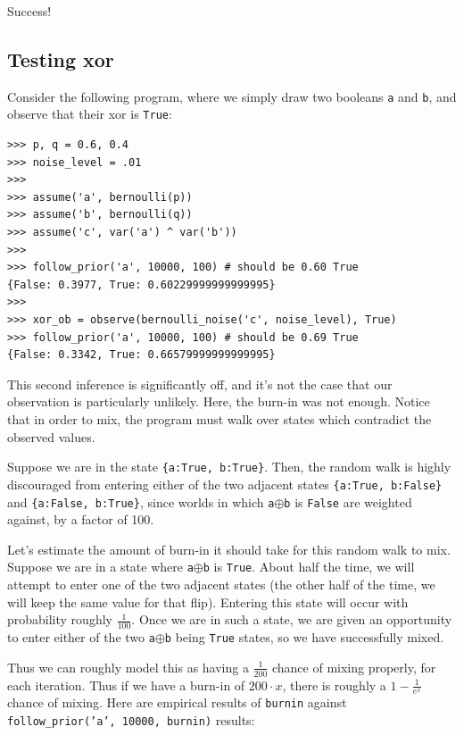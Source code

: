 \documentclass[11pt]{article}
\begin{document}
\noindent Success!


\subsection{Testing xor}

\noindent Consider the following program, where we simply draw two booleans {\tt a} and {\tt b}, and observe that their xor is {\tt True}:

\begin{small}
\begin{verbatim}
>>> p, q = 0.6, 0.4
>>> noise_level = .01
>>>
>>> assume('a', bernoulli(p))
>>> assume('b', bernoulli(q))
>>> assume('c', var('a') ^ var('b'))
>>>
>>> follow_prior('a', 10000, 100) # should be 0.60 True
{False: 0.3977, True: 0.60229999999999995}
>>>
>>> xor_ob = observe(bernoulli_noise('c', noise_level), True)
>>> follow_prior('a', 10000, 100) # should be 0.69 True
{False: 0.3342, True: 0.66579999999999995}
\end{verbatim}
\end{small}



This second inference is significantly off, and it's not the case that our observation is particularly unlikely.  Here, the burn-in was not enough.  Notice that in order to mix, the program must walk over states which contradict the observed values.  

Suppose we are in the state {\tt \{a:True, b:True\}}.  Then, the random walk is highly discouraged from entering either of the two adjacent states {\tt \{a:True, b:False\}} and {\tt \{a:False, b:True\}}, since worlds in which {\tt a$\oplus$b} is {\tt False} are weighted against, by a factor of 100.  

Let's estimate the amount of burn-in it should take for this random walk to mix.  Suppose we are in a state where {\tt a$\oplus$b} is {\tt True}.  About half the time, we will attempt to enter one of the two adjacent states (the other half of the time, we will keep the same value for that flip).  Entering this state will occur with probability roughly $\frac{1}{100}$.  Once we are in such a state, we are given an opportunity to enter either of the two {\tt a$\oplus$b} being {\tt True} states, so we have successfully mixed.  

Thus we can roughly model this as having a $\frac{1}{200}$ chance of mixing properly, for each iteration.  Thus if we have a burn-in of $200 \cdot x$, there is roughly a $1 - \frac{1}{e^x}$ chance of mixing.  Here are empirical results of {\tt burnin} against {\tt follow\_prior('a', 10000, burnin)} results:
\end{document}
